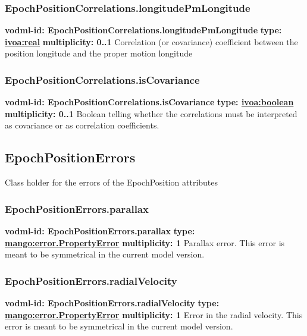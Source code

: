     \subsubsection{EpochPositionCorrelations.longitudePmLongitude}
      \textbf{vodml-id: EpochPositionCorrelations.longitudePmLongitude} \newline
      \textbf{type: \hyperref[sect:ivoa]{ivoa:real}} \newline
      \textbf{multiplicity: 0..1} \newline
      Correlation (or covariance) coefficient between the position longitude and the proper motion longitude

    \subsubsection{EpochPositionCorrelations.isCovariance}
      \textbf{vodml-id: EpochPositionCorrelations.isCovariance} \newline
      \textbf{type: \hyperref[sect:ivoa]{ivoa:boolean}} \newline
      \textbf{multiplicity: 0..1} \newline
      Boolean telling whether the correlations must be interpreted as covariance or as correlation coefficients.

  \subsection{EpochPositionErrors}
  \label{sect:EpochPositionErrors}
    Class holder for the errors of the EpochPosition attributes

    \subsubsection{EpochPositionErrors.parallax}
      \textbf{vodml-id: EpochPositionErrors.parallax} \newline
      \textbf{type: \hyperref[sect:error.PropertyError]{mango:error.PropertyError}} \newline
      \textbf{multiplicity: 1} \newline
      Parallax error. This error is meant to be symmetrical in the current model version.

    \subsubsection{EpochPositionErrors.radialVelocity}
      \textbf{vodml-id: EpochPositionErrors.radialVelocity} \newline
      \textbf{type: \hyperref[sect:error.PropertyError]{mango:error.PropertyError}} \newline
      \textbf{multiplicity: 1} \newline
      Error in the radial velocity. This error is meant to be symmetrical in the current model version.

